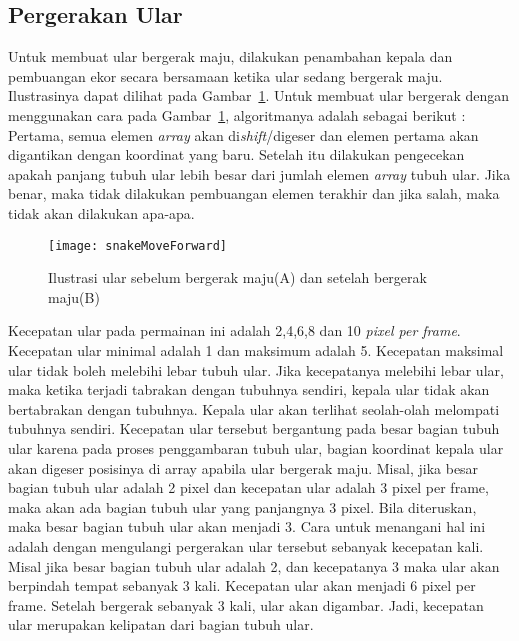 \subsection{Pergerakan Ular}
Untuk membuat ular bergerak maju, dilakukan penambahan kepala dan pembuangan ekor secara bersamaan ketika ular sedang bergerak maju. Ilustrasinya dapat dilihat pada Gambar~\ref{fig:snakeMoveForward}. Untuk membuat ular bergerak dengan menggunakan cara pada Gambar~\ref{fig:snakeMoveForward}, algoritmanya adalah sebagai berikut : Pertama, semua elemen \textit{array} akan di\textit{shift}/digeser dan elemen pertama akan digantikan dengan koordinat yang baru. Setelah itu dilakukan pengecekan apakah panjang tubuh ular lebih besar dari jumlah elemen \textit{array} tubuh ular. Jika benar, maka tidak dilakukan pembuangan elemen terakhir dan jika salah, maka tidak akan dilakukan apa-apa. 

\begin{figure}[H]
	\centering  
	\texttt{[image: snakeMoveForward]}  
	\caption[Ilustrasi ular sebelum bergerak maju(A) dan setelah bergerak maju(B)]{Ilustrasi ular sebelum bergerak maju(A) dan setelah bergerak maju(B)}
	\label{fig:snakeMoveForward} 
\end{figure}

Kecepatan ular pada permainan ini adalah 2,4,6,8 dan 10 \textit{pixel per frame}. Kecepatan ular minimal adalah 1 dan maksimum adalah 5. Kecepatan maksimal ular tidak boleh melebihi lebar tubuh ular. Jika kecepatanya melebihi lebar ular, maka ketika terjadi tabrakan dengan tubuhnya sendiri, kepala ular tidak akan bertabrakan dengan tubuhnya. Kepala ular akan terlihat seolah-olah melompati tubuhnya sendiri. Kecepatan ular tersebut bergantung pada besar bagian tubuh ular karena pada proses penggambaran tubuh ular, bagian koordinat kepala ular akan digeser posisinya di array apabila ular bergerak maju. Misal, jika besar bagian tubuh ular adalah 2 pixel dan kecepatan ular adalah 3 pixel per frame, maka akan ada bagian tubuh ular yang panjangnya 3 pixel. Bila diteruskan, maka besar bagian tubuh ular akan menjadi 3. Cara untuk menangani hal ini adalah dengan mengulangi pergerakan ular tersebut sebanyak kecepatan kali. Misal jika besar bagian tubuh ular adalah 2, dan kecepatanya 3 maka ular akan berpindah tempat sebanyak 3 kali. Kecepatan ular akan menjadi 6 pixel per frame. Setelah bergerak sebanyak 3 kali, ular akan digambar. Jadi, kecepatan ular merupakan kelipatan dari bagian tubuh ular. \\

